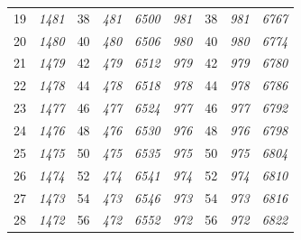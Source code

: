 \documentclass[10pt,fleqn]{article}
\begin{document}
\begin{longtable}{c|cccccccc}
19 & {\color{blue} \it 1481 \rm} & {\color{black} 38} & {\color{blue} \it 481 \rm} & {\color{blue} \it 6500 \rm} & {\color{blue} \it 981 \rm} & {\color{black} 38} & {\color{blue} \it 981 \rm} & {\color{blue} \it 6767 \rm} \\
20 & {\color{blue} \it 1480 \rm} & {\color{black} 40} & {\color{blue} \it 480 \rm} & {\color{blue} \it 6506 \rm} & {\color{blue} \it 980 \rm} & {\color{black} 40} & {\color{blue} \it 980 \rm} & {\color{blue} \it 6774 \rm} \\
21 & {\color{blue} \it 1479 \rm} & {\color{black} 42} & {\color{blue} \it 479 \rm} & {\color{blue} \it 6512 \rm} & {\color{blue} \it 979 \rm} & {\color{black} 42} & {\color{blue} \it 979 \rm} & {\color{blue} \it 6780 \rm} \\
22 & {\color{blue} \it 1478 \rm} & {\color{black} 44} & {\color{blue} \it 478 \rm} & {\color{blue} \it 6518 \rm} & {\color{blue} \it 978 \rm} & {\color{black} 44} & {\color{blue} \it 978 \rm} & {\color{blue} \it 6786 \rm} \\
23 & {\color{blue} \it 1477 \rm} & {\color{black} 46} & {\color{blue} \it 477 \rm} & {\color{blue} \it 6524 \rm} & {\color{blue} \it 977 \rm} & {\color{black} 46} & {\color{blue} \it 977 \rm} & {\color{blue} \it 6792 \rm} \\
24 & {\color{blue} \it 1476 \rm} & {\color{black} 48} & {\color{blue} \it 476 \rm} & {\color{blue} \it 6530 \rm} & {\color{blue} \it 976 \rm} & {\color{black} 48} & {\color{blue} \it 976 \rm} & {\color{blue} \it 6798 \rm} \\
25 & {\color{blue} \it 1475 \rm} & {\color{black} 50} & {\color{blue} \it 475 \rm} & {\color{blue} \it 6535 \rm} & {\color{blue} \it 975 \rm} & {\color{black} 50} & {\color{blue} \it 975 \rm} & {\color{blue} \it 6804 \rm} \\
26 & {\color{blue} \it 1474 \rm} & {\color{black} 52} & {\color{blue} \it 474 \rm} & {\color{blue} \it 6541 \rm} & {\color{blue} \it 974 \rm} & {\color{black} 52} & {\color{blue} \it 974 \rm} & {\color{blue} \it 6810 \rm} \\
27 & {\color{blue} \it 1473 \rm} & {\color{black} 54} & {\color{blue} \it 473 \rm} & {\color{blue} \it 6546 \rm} & {\color{blue} \it 973 \rm} & {\color{black} 54} & {\color{blue} \it 973 \rm} & {\color{blue} \it 6816 \rm} \\
28 & {\color{blue} \it 1472 \rm} & {\color{black} 56} & {\color{blue} \it 472 \rm} & {\color{blue} \it 6552 \rm} & {\color{blue} \it 972 \rm} & {\color{black} 56} & {\color{blue} \it 972 \rm} & {\color{blue} \it 6822 \rm} \\

\end{longtable}
\end{document}
